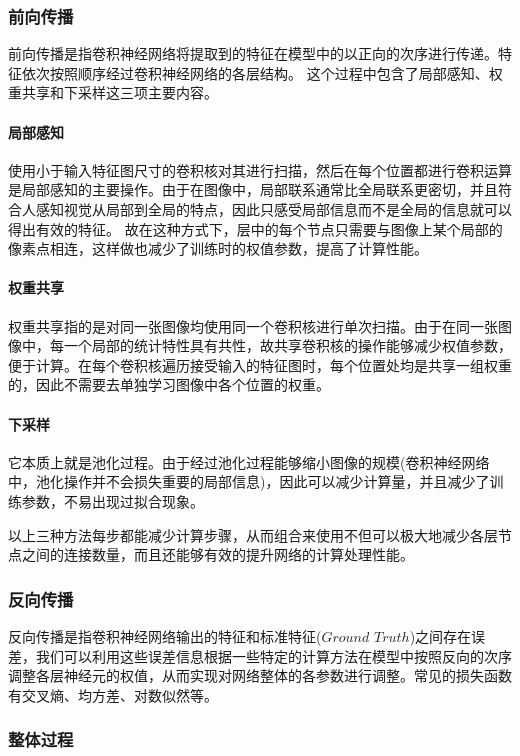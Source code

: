 \subsubsection{前向传播}

前向传播是指卷积神经网络将提取到的特征在模型中的以正向的次序进行传递。特征依次按照顺序经过卷积神经网络的各层结构。
这个过程中包含了局部感知、权重共享和下采样这三项主要内容。

\paragraph{局部感知}使用小于输入特征图尺寸的卷积核对其进行扫描，然后在每个位置都进行卷积运算是局部感知的主要操作。由于在图像中，局部联系通常比全局联系更密切，并且符合人感知视觉从局部到全局的特点，因此只感受局部信息而不是全局的信息就可以得出有效的特征。
故在这种方式下，层中的每个节点只需要与图像上某个局部的像素点相连，这样做也减少了训练时的权值参数，提高了计算性能。

\paragraph{权重共享}权重共享指的是对同一张图像均使用同一个卷积核进行单次扫描。由于在同一张图像中，每一个局部的统计特性具有共性，故共享卷积核的操作能够减少权值参数，便于计算。在每个卷积核遍历接受输入的特征图时，每个位置处均是共享一组权重的，因此不需要去单独学习图像中各个位置的权重。

\paragraph{下采样}它本质上就是池化过程。由于经过池化过程能够缩小图像的规模(卷积神经网络中，池化操作并不会损失重要的局部信息)，因此可以减少计算量，并且减少了训练参数，不易出现过拟合现象。

以上三种方法每步都能减少计算步骤，从而组合来使用不但可以极大地减少各层节点之间的连接数量，而且还能够有效的提升网络的计算处理性能。

\subsubsection{反向传播}

反向传播是指卷积神经网络输出的特征和标准特征($Ground$ $Truth$)之间存在误差，我们可以利用这些误差信息根据一些特定的计算方法在模型中按照反向的次序调整各层神经元的权值，从而实现对网络整体的各参数进行调整。常见的损失函数有交叉熵、均方差、对数似然等。

\subsubsection{整体过程}

